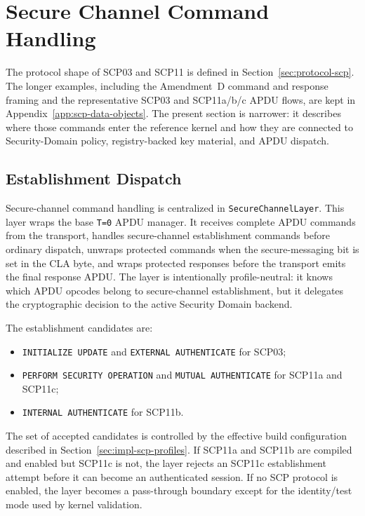 \section{Secure Channel Command Handling}
\label{sec:impl-scp-commands}

The protocol shape of SCP03 and SCP11 is defined in
Section~\ref{sec:protocol-scp}. The longer examples, including the
Amendment~D command and response framing and the
representative SCP03 and SCP11a/b/c APDU flows, are kept in
Appendix~\ref{app:scp-data-objects}. The present section is narrower: it
describes where those commands enter the reference kernel and how they are
connected to Security-Domain policy, registry-backed key material, and APDU
dispatch.

\subsection{Establishment Dispatch}
\label{sec:impl-scp-establishment-dispatch}

Secure-channel command handling is centralized in
\texttt{SecureChannelLayer}. This layer wraps the base \texttt{T=0} APDU
manager. It receives complete APDU commands from the transport, handles
secure-channel establishment commands before ordinary dispatch, unwraps
protected commands when the secure-messaging bit is set in the CLA byte, and
wraps protected responses before the transport emits the final response APDU.
The layer is intentionally profile-neutral: it knows which APDU opcodes belong
to secure-channel establishment, but it delegates the cryptographic decision to
the active Security Domain backend.

The establishment candidates are:
\begin{itemize}
\item \texttt{INITIALIZE UPDATE} and \texttt{EXTERNAL AUTHENTICATE} for SCP03;
\item \texttt{PERFORM SECURITY OPERATION} and \texttt{MUTUAL AUTHENTICATE} for
  SCP11a and SCP11c;
\item \texttt{INTERNAL AUTHENTICATE} for SCP11b.
\end{itemize}

The set of accepted candidates is controlled by the effective build
configuration described in Section~\ref{sec:impl-scp-profiles}. If SCP11a and
SCP11b are compiled and enabled but SCP11c is not, the layer rejects an SCP11c
establishment attempt before it can become an authenticated session. If no SCP
protocol is enabled, the layer becomes a pass-through boundary except for the
identity/test mode used by kernel validation.


